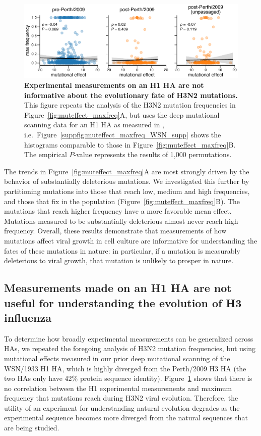 \documentclass[9pt,twocolumn,twoside]{pnas-new}
\begin{document}
\begin{figure}
\centering
\includegraphics[width=12cm]{figs/muteffect_by_maxfreq_WSN/muteffect_by_maxfreq_WSN.pdf}
\caption{\label{fig:muteffect_maxfreq_WSN}
{\bf Experimental measurements on an H1 HA are not informative about the evolutionary fate of H3N2 mutations.}
This figure repeats the analysis of the H3N2 mutation frequencies in Figure~\ref{fig:muteffect_maxfreq}A, but uses the deep mutational scanning data for an H1 HA as measured in \cite{doud2016accurate}, i.e.\
Figure~\ref{suppfig:muteffect_maxfreq_WSN_supp} shows the histograms comparable to those in Figure~\ref{fig:muteffect_maxfreq}B.
The empirical $P$-value represents the results of 1,000 permutations.
}
\end{figure}

The trends in Figure~\ref{fig:muteffect_maxfreq}A are most strongly driven by the behavior of substantially deleterious mutations.
We investigated this further by partitioning mutations into those that reach low, medium and high frequencies, and those that fix in the population (Figure~\ref{fig:muteffect_maxfreq}B).
The mutations that reach higher frequency have a more favorable mean effect.
Mutations measured to be substantially deleterious almost never reach high frequency.
Overall, these results demonstrate that measurements of how mutations affect viral growth in cell culture are informative for understanding the fates of these mutations in nature: in particular, if a mutation is measurably deleterious to viral growth, that mutation is unlikely to prosper in nature.

\subsection*{Measurements made on an H1 HA are not useful for understanding the evolution of H3 influenza}
To determine how broadly experimental measurements can be generalized across HAs, we repeated the foregoing analysis of H3N2 mutation frequencies, but using mutational effects measured in our prior deep mutational scanning of the WSN/1933 H1 HA, which is highly diverged from the Perth/2009 H3 HA (the two HAs only have 42\% protein sequence identity).
Figure~\ref{fig:muteffect_maxfreq_WSN} shows that there is no correlation between the H1 experimental measurements and maximum frequency that mutations reach during H3N2 viral evolution.
Therefore, the utility of an experiment for understanding natural evolution degrades as the experimental sequence becomes more diverged from the natural sequences that are being studied.
\end{document}
